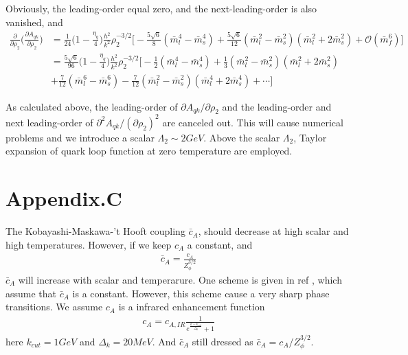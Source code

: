 \documentclass[12pt]{article}
\begin{document}
Obviously, the leading-order equal zero, and the next-leading-order is also vanished, and
\begin{equation}
\begin{split}
\frac{\partial}{\partial \rho_2}\Big(\frac{\partial A_{qk}}{\partial \rho_2}\Big)
&=\frac{1}{24}\Big(1-\frac{\eta_q}{4}\Big)\frac{h^2}{k^2}\rho_2^{-3/2}
\Big [ - \frac{5 \sqrt{6}}{8}(\bar m_l^4 - \bar m_s^4) + \frac{5 \sqrt{6}}{12}(\bar m_l^2 - \bar m_s^2) (\bar m_l^2 + 2 \bar m_s^2) +
\mathcal{O}(\bar m_f^6)\Big ]\\
&=\frac{5 \sqrt{6}}{96} \Big(1-\frac{\eta_q}{4}\Big) \frac{h^2}{k^2}\rho_2^{-3/2} \Big [ - \frac{1}{2}(\bar m_l^4 - \bar m_s^4) + \frac{1}{3}(\bar m_l^2 - \bar m_s^2) (\bar m_l^2 + 2 \bar m_s^2) \\ &+\frac{7}{12}(\bar m_l^6 - \bar m_s^6)
-\frac{7}{12}(\bar m_l^2 - \bar m_s^2)(\bar m_l^4 + 2 \bar m_s^4) +\cdots\Big]
\end{split}
\end{equation}

As calculated above, the leading-order of $\partial A_{qk}/\partial \rho_2$ and the leading-order and next leading-order of $\partial^2 A_{qk}/(\partial \rho_2)^2$ are canceled out. This will cause numerical problems and we introduce a scalar $\Lambda_2 \sim 2GeV$. Above the scalar $\Lambda_2$, Taylor expansion of quark loop function at zero temperature are employed.

\section{Appendix.C}
The Kobayashi-Maskawa-’t Hooft coupling $\bar c_A$, should decrease
at high scalar and high temperatures. However, if we keep $c_A$ a constant,
and 
\begin{align}
\bar c_A=\frac{c_A}{Z_\phi^{3/2}}
\end{align}
$\bar c_A$ will increase with scalar and temperarure. One scheme is given in ref \cite{Rennecke:2016tkm}, which assume that $\bar c_A$ is a constant. However, this scheme cause a very sharp phase transitions. We assume  $c_A$ is a infrared enhancement function
\begin{align}
c_A=c_{A,IR}\frac{1}{e^{\frac{k-k_{cut}}{\Delta_k}}+1}
\end{align}
here $k_{cut}=1 GeV$ and $\Delta_k=20 MeV$. And $\bar c_A$ still dressed as $\bar c_A=c_A/Z_\phi^{3/2}$.
\end{document}
